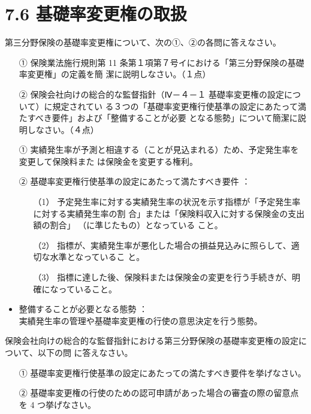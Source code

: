 \documentclass[report,gutter=10mm,fore-edge=10mm,uplatex,dvipdfmx]{jlreq}
\begin{document}
\section{7.6 基礎率変更権の取扱}
第三分野保険の基礎率変更権について、次の①、②の各問に答えなさい。
\begin{enumerate}
 \item [①]  保険業法施行規則第 11 条第１項第７号イにおける「第三分野保険の基礎率変更権」の定義を簡
 潔に説明しなさい。（１点）
 \item [②] 保険会社向けの総合的な監督指針（Ⅳ－４－１ 基礎率変更権の設定について）に規定されてい
 る３つの「基礎率変更権行使基準の設定にあたって満たすべき要件」および「整備することが必要
 となる態勢」について簡潔に説明しなさい。（４点）
\end{enumerate}
\begin{itemize}
 \item [①] 実績発生率が予測と相違する（ことが見込まれる）ため、予定発生率を変更して保険料また
 は保険金を変更する権利。
 \item [②] 基礎率変更権行使基準の設定にあたって満たすべき要件 ：
\begin{enumerate}
 \item [（1）] 予定発生率に対する実績発生率の状況を示す指標が「予定発生率に対する実績発生率の割
 合」または「保険料収入に対する保険金の支出額の割合」
 （に準じたもの）となっている
 こと。
 \item  [（2）]指標が、実績発生率が悪化した場合の損益見込みに照らして、適切な水準となっているこ
 と。
 \item  [（3）]指標に達した後、保険料または保険金の変更を行う手続きが、明確になっていること。
\end{enumerate} 
 \item 整備することが必要となる態勢 ：\\
 実績発生率の管理や基礎率変更権の行使の意思決定を行う態勢。
\end{itemize}

保険会社向けの総合的な監督指針における第三分野保険の基礎率変更権の設定について、以下の問
に答えなさい。
\begin{itemize}
 \item [①]基礎率変更権行使基準の設定にあたっての満たすべき要件を挙げなさい。
 \item [②]基礎率変更権の行使のための認可申請があった場合の審査の際の留意点を 4 つ挙げなさい。
\end{itemize}
\end{document}

